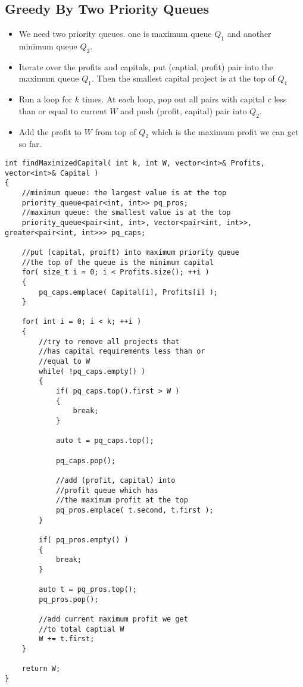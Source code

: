 \subsection{Greedy By Two Priority Queues}
\begin{itemize}
\item We need two priority queues. one is maximum queue $Q_1$ and another minimum queue $Q_2$.
\item Iterate over the profits and capitals, put (captial, profit) pair into the maximum queue $Q_1$. Then the smallest capital project is at the top of $Q_1$
\item Run a loop for $k$ times. At each loop, pop out all pairs with capital $c$ less than or equal to current $W$ and push (profit, capital) pair into $Q_2$.
\item Add the profit to $W$ from top of $Q_2$ which is the maximum profit we can get so far.
\end{itemize}

\setcounter{lstlisting}{0}
\begin{lstlisting}[style=customc, caption={Greedy By Two Prority Queue}]
int findMaximizedCapital( int k, int W, vector<int>& Profits, vector<int>& Capital )
{
    //minimum queue: the largest value is at the top
    priority_queue<pair<int, int>> pq_pros;
    //maximum queue: the smallest value is at the top
    priority_queue<pair<int, int>, vector<pair<int, int>>, greater<pair<int, int>>> pq_caps;

    //put (capital, proift) into maximum priority queue
    //the top of the queue is the minimum capital
    for( size_t i = 0; i < Profits.size(); ++i )
    {
        pq_caps.emplace( Capital[i], Profits[i] );
    }

    for( int i = 0; i < k; ++i )
    {
        //try to remove all projects that
        //has capital requirements less than or
        //equal to W
        while( !pq_caps.empty() )
        {
            if( pq_caps.top().first > W )
            {
                break;
            }

            auto t = pq_caps.top();

            pq_caps.pop();

            //add (profit, capital) into
            //profit queue which has
            //the maximum profit at the top
            pq_pros.emplace( t.second, t.first );
        }

        if( pq_pros.empty() )
        {
            break;
        }

        auto t = pq_pros.top();
        pq_pros.pop();

        //add current maximum profit we get
        //to total captial W
        W += t.first;
    }

    return W;
}
\end{lstlisting}

